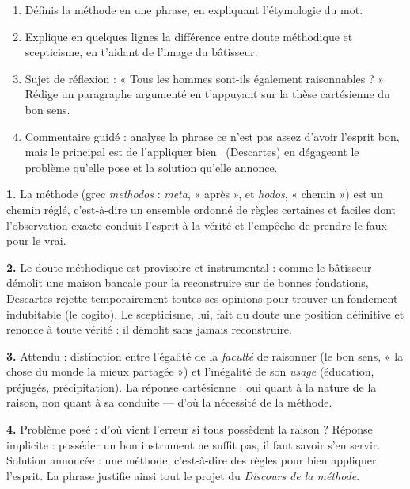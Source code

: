 \documentclass[11pt]{article}
\begin{document}
\begin{exercice}
\begin{enumerate}
\item Définis la méthode en une phrase, en expliquant l'étymologie du mot.
\item Explique en quelques lignes la différence entre doute méthodique et scepticisme, en t'aidant de l'image du bâtisseur.
\item Sujet de réflexion : « Tous les hommes sont-ils également raisonnables ? » Rédige un paragraphe argumenté en t'appuyant sur la thèse cartésienne du bon sens.
\item Commentaire guidé : analyse la phrase \guillemotleft ce n'est pas assez d'avoir l'esprit bon, mais le principal est de l'appliquer bien \guillemotright\ (Descartes) en dégageant le problème qu'elle pose et la solution qu'elle annonce.
\end{enumerate}
\end{exercice}

\begin{corrige}[Exercice 1 à 4]
\textbf{1.} La méthode (grec \emph{methodos} : \emph{meta}, « après », et \emph{hodos}, « chemin ») est un chemin réglé, c'est-à-dire un ensemble ordonné de règles certaines et faciles dont l'observation exacte conduit l'esprit à la vérité et l'empêche de prendre le faux pour le vrai.

\textbf{2.} Le doute méthodique est provisoire et instrumental : comme le bâtisseur démolit une maison bancale pour la reconstruire sur de bonnes fondations, Descartes rejette temporairement toutes ses opinions pour trouver un fondement indubitable (le cogito). Le scepticisme, lui, fait du doute une position définitive et renonce à toute vérité : il démolit sans jamais reconstruire.

\textbf{3.} Attendu : distinction entre l'égalité de la \emph{faculté} de raisonner (le bon sens, « la chose du monde la mieux partagée ») et l'inégalité de son \emph{usage} (éducation, préjugés, précipitation). La réponse cartésienne : oui quant à la nature de la raison, non quant à sa conduite — d'où la nécessité de la méthode.

\textbf{4.} Problème posé : d'où vient l'erreur si tous possèdent la raison ? Réponse implicite : posséder un bon instrument ne suffit pas, il faut savoir s'en servir. Solution annoncée : une méthode, c'est-à-dire des règles pour bien appliquer l'esprit. La phrase justifie ainsi tout le projet du \emph{Discours de la méthode}.
\end{corrige}
\end{document}
